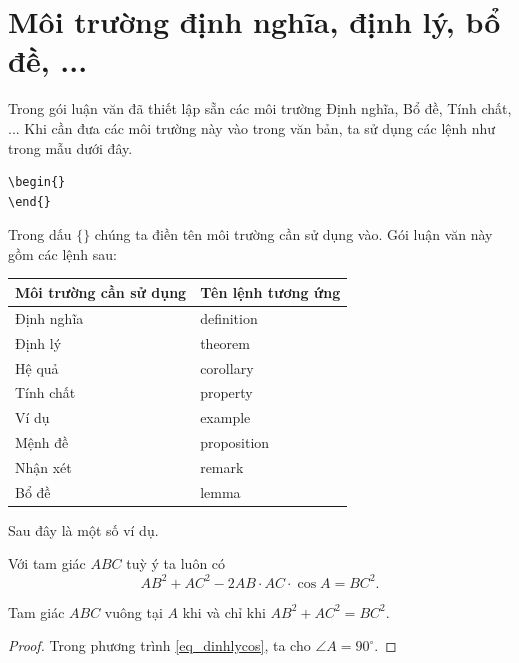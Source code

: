 \section{Môi trường định nghĩa, định lý, bổ đề, ...}
Trong gói luận văn đã thiết lập sẵn các môi trường Định nghĩa, Bổ đề, Tính chất, ... Khi cần đưa các môi trường này vào trong văn bản, ta sử dụng các lệnh như trong mẫu dưới đây. 
\begin{verbatim}
\begin{}
\end{}
\end{verbatim}
Trong dấu $\{ \}$ chúng ta điền tên môi trường cần sử dụng vào. Gói luận văn này gồm các lệnh sau:
\begin{table}[!htp]
\centering
\begin{tabular}{|l|l|}
\hline
\textbf{Môi trường cần sử dụng} & \textbf{Tên lệnh tương ứng} \\
\hline
Định nghĩa & definition  \\
\hline
Định lý & theorem  \\
\hline
Hệ quả & corollary \\
\hline
Tính chất & property  \\
\hline
Ví dụ & example  \\
\hline
Mệnh đề & proposition  \\
\hline
Nhận xét & remark \\
\hline
Bổ đề & lemma \\
\hline
\end{tabular}
\end{table}

Sau đây là một số ví dụ.

\begin{theorem}
Với tam giác $ABC$ tuỳ ý ta luôn có
\begin{equation} \label{eq_dinhlycos} %
    AB^2+AC^2-2AB \cdot AC \cdot \cos A = BC^2.
\end{equation}
\end{theorem}

\begin{corollary}
Tam giác $ABC$ vuông tại $A$ khi và chỉ khi $AB^2+AC^2=BC^2$.
\end{corollary}

\begin{proof}
Trong phương trình \eqref{eq_dinhlycos}, ta cho $\angle A = 90^{\circ}$.
\end{proof}

